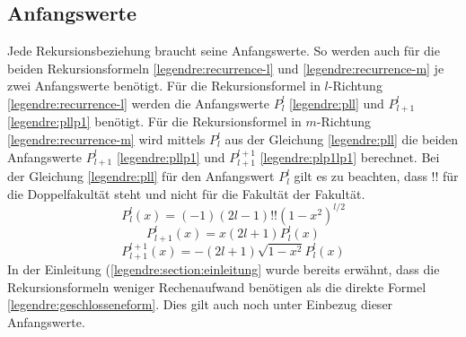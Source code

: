 \subsection{Anfangswerte
\label{legendre:subsection:anfangswerte}}
Jede Rekursionsbeziehung braucht seine Anfangswerte.
So werden auch für die beiden Rekursionsformeln \eqref{legendre:recurrence-l} und \eqref{legendre:recurrence-m} je zwei Anfangswerte benötigt.
Für die Rekursionsformel in $l$-Richtung \eqref{legendre:recurrence-l} werden die Anfangswerte $P^{l}_{l}$ \eqref{legendre:pll} und $P^{l}_{l+1}$ \eqref{legendre:pllp1} benötigt.
Für die Rekursionsformel in $m$-Richtung \eqref{legendre:recurrence-m} wird mittels $P^{l}_{l}$ aus der Gleichung \eqref{legendre:pll} die beiden Anfangswerte $P^{l}_{l+1}$ \eqref{legendre:pllp1} und $P^{l+1}_{l+1}$ \eqref{legendre:plp1lp1} berechnet.
Bei der Gleichung \eqref{legendre:pll} für den Anfangswert $P^{l}_{l}$ gilt es zu beachten, dass $!!$ für die Doppelfakultät steht und nicht für die Fakultät der Fakultät.
\begin{equation}
P^{l}_{l}(x)
=(-1)(2l-1)!!(1-x^2)^{l/2}
\label{legendre:pll}
\end{equation}
\begin{equation}
P^{l}_{l+1}(x)
=x(2l+1)P^{l}_{l}(x)
\label{legendre:pllp1}
\end{equation}
\begin{equation}
P^{l+1}_{l+1}(x)
=-(2l+1)\sqrt{1-x^2}P^{l}_{l}(x)
\label{legendre:plp1lp1}
\end{equation}
In der Einleitung (\ref{legendre:section:einleitung} wurde bereits erwähnt, dass die Rekursionsformeln weniger Rechenaufwand benötigen als die direkte Formel \eqref{legendre:geschlosseneform}.
Dies gilt auch noch unter Einbezug dieser Anfangswerte.

